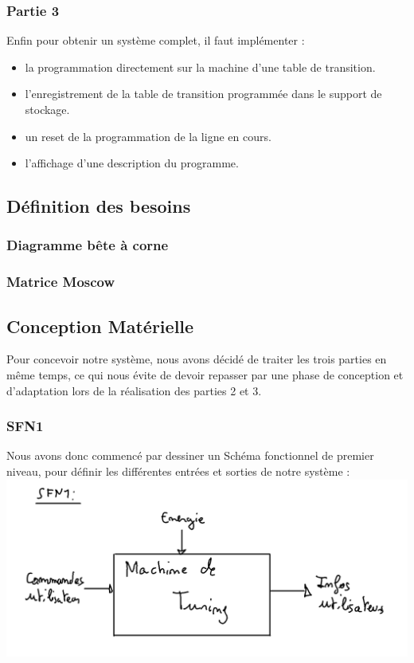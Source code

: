 \documentclass[12pt]{article}
\begin{document}
	 \subsubsection{Partie 3}
	 Enfin pour obtenir un système complet, il faut implémenter :\\
	 \begin{itemize}[label=$-$]
	 	\item la programmation directement sur la machine d'une table de transition.\\
	 	\item l'enregistrement de la table de transition programmée dans le support de stockage.\\
	 	\item un reset de la programmation de la ligne en cours.\\
	 	\item l'affichage d'une description du programme.
	 	\end{itemize}
 	\subsection{Définition des besoins}
 	 \subsubsection{Diagramme bête à corne}
 	 \subsubsection{Matrice Moscow}
	 \subsection{Conception Matérielle}
	 Pour concevoir notre système, nous avons décidé de traiter les trois parties en même temps, ce qui nous évite de devoir repasser par une phase de conception et d'adaptation lors de la réalisation des parties 2 et 3.\\
	 \subsubsection{SFN1}
	 Nous avons donc commencé par dessiner un Schéma fonctionnel de premier niveau, pour définir les différentes entrées et sorties de notre système :\\
	 \includegraphics[width=\textwidth]{img/SFN1}
\end{document}
